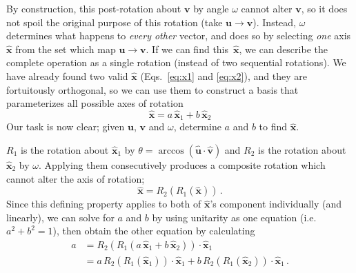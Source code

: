 \documentclass[12pt, nofootinbib, notitlepage]{revtex4-1}
\renewcommand{\vec}[1]{\boldsymbol{#1}}
\newcommand{\vecN}[1]{\vec{\hat{#1}}}
\newcommand{\ds}{^{}}
\newcommand{\ax}{\vecN{x}}
\begin{document}
By construction, this post-rotation about $\vec{v}$ by angle $\omega$ 
cannot alter $\vec{v}$, so it does not spoil
the original purpose of this rotation (take $\vec{u}\to\vec{v}$).
Instead, $\omega$ determines what happens to \emph{every other} vector, 
and does so by selecting \emph{one} axis $\ax$ from the set which map $\vec{u}\to\vec{v}$.
If we can find this~$\ax$, we can describe the complete operation as a single rotation 
(instead of two sequential rotations).
We have already found two valid $\ax$ (Eqs.~\ref{eq:x1} and \ref{eq:x2}), 
and they are fortuitously orthogonal, so we can use them to construct
a basis that parameterizes all possible axes of rotation
\begin{equation}
	\ax = a\,\ax_1\ds + b\,\ax_2\ds
\end{equation}
Our task is now clear; given $\vec{u}$, $\vec{v}$ and $\omega$, 
determine $a$ and $b$ to find $\ax$.

$R_1\ds$ is the rotation about $\ax_1\ds$
by $\theta=\arccos(\vecN{u}\cdot\vecN{v})$ and $R_2\ds$ is the rotation about $\ax_2\ds$ by $\omega$.
Applying them consecutively produces a composite rotation
which cannot alter the axis of rotation;
\begin{equation}
	\ax = R_2\ds(R_1\ds(\ax))\,.
\end{equation}
Since this defining property applies to both of $\ax$'s component individually (and linearly), 
we can solve for $a$ and $b$ by using unitarity as one equation (i.e.\ ${a^2+b^2=1}$), 
then obtain the other equation by calculating
\begin{align}\label{eq:a}
	a & = R_2\ds(R_1\ds(a\,\ax_1\ds + b\,\ax_2\ds))\cdot\ax_1\ds\nonumber\\
		& = a\,R_2\ds(R_1\ds(\ax_1\ds))\cdot\ax_1\ds + b\,R_2\ds(R_1\ds(\ax_2\ds))\cdot\ax_1\ds\,.
\end{align}
\end{document}

